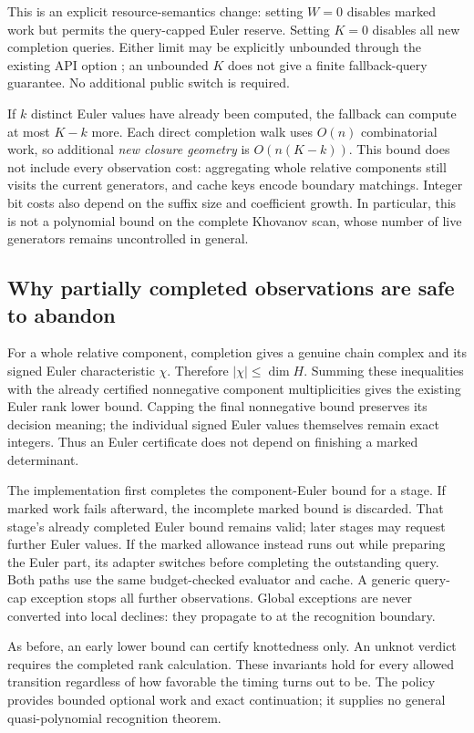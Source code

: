 This is an explicit resource-semantics change: setting $W=0$ disables marked
work but permits the query-capped Euler reserve.  Setting $K=0$ disables all
new completion queries.  Either limit may be explicitly unbounded through
the existing API option ; an unbounded $K$ does not give a finite
fallback-query guarantee.  No additional public switch is required.

If $k$ distinct Euler values have already been computed, the fallback can
compute at most $K-k$ more.  Each direct completion walk uses $O(n)$
combinatorial work, so additional \emph{new closure geometry} is
$O(n(K-k))$.  This bound does not include every observation cost: aggregating
whole relative components still visits the current generators, and cache
keys encode boundary matchings.  Integer bit costs also depend on the
suffix size and coefficient growth.  In particular, this is not a
polynomial bound on the complete Khovanov scan, whose number of live
generators remains uncontrolled in general.

\subsection{Why partially completed observations are safe to abandon}

For a whole relative component, completion gives a genuine chain complex
and its signed Euler characteristic $\chi$.  Therefore
$|\chi|\le\dim H$.  Summing these inequalities with the already certified
nonnegative component multiplicities gives the existing Euler rank lower
bound.  Capping the final nonnegative bound preserves its decision meaning;
the individual signed Euler values themselves remain exact integers.
Thus an Euler certificate does not depend on finishing a marked determinant.

The implementation first completes the component-Euler bound for a stage.
If marked work fails afterward, the incomplete marked bound is discarded.
That stage's already completed Euler bound remains valid; later stages may
request further Euler values.  If the marked allowance instead runs out
while preparing the Euler part, its adapter switches before completing the
outstanding query.  Both paths use the same budget-checked evaluator and
cache.  A generic query-cap exception stops all further observations.
Global  exceptions are never converted into local declines:
they propagate to  at the recognition boundary.

As before, an early lower bound can certify knottedness only.  An unknot
verdict requires the completed rank calculation.  These invariants hold
for every allowed transition regardless of how favorable the timing turns
out to be.  The policy provides bounded optional work and exact continuation;
it supplies no general quasi-polynomial recognition theorem.

